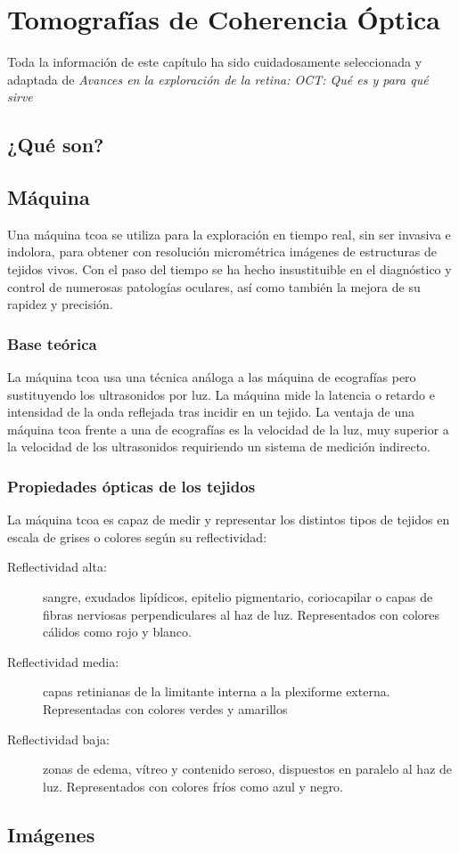 \chapter{Tomografías de Coherencia Óptica}
Toda la información de este capítulo ha sido cuidadosamente
seleccionada y adaptada de \emph{Avances en la exploración de la
  retina: OCT: Qué es y para qué sirve}\cite{oct-bib}
\section{¿Qué son?}
\section{Máquina }
Una máquina \gls{tcoa} se utiliza para la exploración en tiempo real, sin ser
invasiva e indolora, para obtener con resolución micrométrica imágenes
de estructuras de tejidos vivos. Con el paso del tiempo se ha hecho
insustituible en el diagnóstico y control de numerosas patologías
oculares, así como también la mejora de su rapidez y precisión.
\subsection{Base teórica}
La máquina \gls{tcoa} usa una técnica análoga a las máquina de ecografías
pero sustituyendo los ultrasonidos por luz. La máquina mide la
latencia o retardo e intensidad de la onda reflejada tras incidir en
un tejido. La ventaja de una máquina \gls{tcoa} frente a una de ecografías es
la velocidad de la luz, muy superior a la velocidad de los
ultrasonidos requiriendo un sistema de medición indirecto.
\subsection{Propiedades ópticas de los tejidos}
La máquina \gls{tcoa} es capaz de medir y representar los distintos
tipos de tejidos en escala de grises o colores según su reflectividad:
\begin{description}
\item[Reflectividad alta:] sangre, exudados lipídicos, epitelio pigmentario,
coriocapilar o capas de fibras nerviosas perpendiculares al haz de
luz. Representados con colores cálidos como rojo y blanco.
\item[Reflectividad media:] capas retinianas de la limitante interna a la
plexiforme externa. Representadas con colores verdes y amarillos
\item[Reflectividad baja:] zonas de edema, vítreo y contenido seroso,
dispuestos en paralelo al haz de luz. Representados con colores fríos
como azul y negro.
\end{description}
\section{Imágenes }